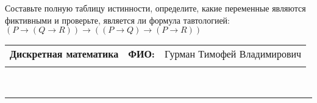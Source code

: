 \documentclass[10pt]{exam}
\newcommand{\class}{Дискретная математика}
\newcommand{\examdate}{}
\begin{document}
\begin{questions}
\begin{enumerate}[a)]
\end{enumerate}\question Составьте полную таблицу истинности, определите, какие переменные являются фиктивными и проверьте, является ли формула тавтологией:
$(P \rightarrow (Q \rightarrow R)) \rightarrow ((P \rightarrow Q) \rightarrow (P \rightarrow R))$

\end{questions}
\newpage
\begin{flushright}
\begin{tabular}{p{2.8in} r l}
\textbf{\class} & \textbf{ФИО:} &Гурман Тимофей Владимирович
\\

\textbf{\examdate} &&\\
\end{tabular}\\
\end{flushright}
\rule[1ex]{\textwidth}{.1pt}
\end{document}
